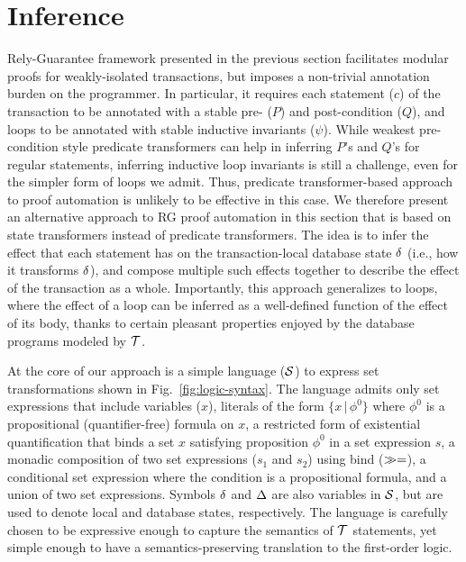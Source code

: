 \section{Inference}
\label{sec:inference}

Rely-Guarantee framework presented in the previous section facilitates
modular proofs for weakly-isolated transactions, but imposes a
non-trivial annotation burden on the programmer. In particular, it
requires each statement ($c$) of the transaction to be annotated with
a stable pre- ($P$) and post-condition ($Q$), and loops to be
annotated with stable inductive invariants ($\psi$). While weakest
pre-condition style predicate transformers can help in inferring $P$'s
and $Q$'s for regular statements, inferring inductive loop invariants
is still a challenge, even for the simpler form of loops we admit.
Thus, predicate transformer-based approach to proof automation is
unlikely to be effective in this case. We therefore present an
alternative approach to RG proof automation in this section that is
based on state transformers instead of predicate transformers. The
idea is to infer the effect that each statement has on the
transaction-local database state $\delta$ (i.e., how it transforms
$\delta$), and compose multiple such effects together to describe the
effect of the transaction as a whole. Importantly, this approach
generalizes to loops, where the effect of a loop can be inferred as a
well-defined function of the effect of its body, thanks to certain
pleasant properties enjoyed by the database programs modeled by
$\mbox{${\mathcal T}$}$.



At the core of our approach is a simple language ($\mathcal{S}$) to express
set transformations shown in Fig.~\ref{fig:logic-syntax}. The language
admits only set expressions that include variables ($x$), literals of
the form $\{x \,|\, \phi^0\}$ where $\phi^0$ is a propositional
(quantifier-free) formula on $x$, a restricted form of existential
quantification that binds a set $x$ satisfying proposition $\phi^0$ in
a set expression $s$, a monadic composition of two set expressions
($s_1$ and $s_2$) using bind ($\gg=$), a conditional set expression
where the condition is a propositional formula, and a union of two set
expressions. Symbols $\delta$ and $\Delta$ are also variables in $\mathcal{S}$,
but are used to denote local and database states, respectively.  The
language is carefully chosen to be expressive enough to capture the
semantics of $\mbox{${\mathcal T}$}$ statements, yet simple enough to have a
semantics-preserving translation to the first-order logic. 

